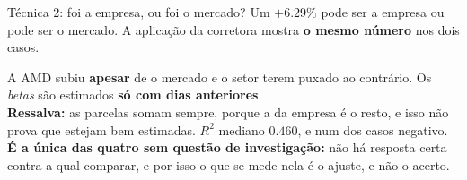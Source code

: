 \documentclass[aspectratio=169]{beamer}
\begin{document}
\begin{frame}{Técnica 2: foi a empresa, ou foi o mercado?}
Um $+6.29\%$ pode ser a empresa ou pode ser o mercado. A aplicação da corretora
mostra \textbf{o mesmo número} nos dois casos.
\vspace{2mm}
\begin{center}
\end{center}
\vspace{1mm}
\footnotesize
A AMD subiu \textbf{apesar} de o mercado e o setor terem puxado ao contrário.
Os \emph{betas} são estimados \textbf{só com dias anteriores}.\\
\textbf{Ressalva:} as parcelas somam sempre, porque a da empresa é o resto, e isso não prova que
estejam bem estimadas. $R^2$ mediano $0.460$, e num dos casos negativo.\\
\textbf{É a única das quatro sem questão de investigação:} não há resposta certa contra a qual
comparar, e por isso o que se mede nela é o ajuste, e não o acerto.
\end{frame}
\end{document}
